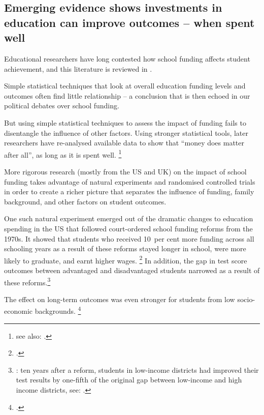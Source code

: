 \documentclass{grattan}
\begin{document}
\subsection{Emerging evidence shows investments in education can improve outcomes -- when spent well}\label{subsec:emerging-evidence-shows-investments-in-education-can-improve-outcomes}

Educational researchers have long contested how school funding affects student achievement, and this literature is reviewed in .

Simple statistical techniques that look at overall education funding levels and outcomes often find little relationship -- a conclusion that is then echoed in our political debates over school funding.

But using simple statistical techniques to assess the impact of funding fails to disentangle the influence of other factors.
Using stronger statistical tools, later researchers have re-analysed available data to show that ``money does matter after all'', as long as it is spent well.%
\footnote{\textcite[][13]{Hedges1994ExchangePartI} see also: \textcites{Greenwald1996EffectSchoolResources}{Krueger2003EconomicConsiderationsClass}.}

More rigorous research (mostly from the US and UK) on the impact of school funding takes advantage of natural experiments and randomised controlled trials in order to create a richer picture that separates the influence of funding, family background, and other factors on student outcomes.

One such natural experiment emerged out of the dramatic changes to education spending in the US that followed court-ordered school funding reforms from the 1970s.
It showed that students who received 10~per cent more funding across all schooling years as a result of these reforms stayed longer in school, were more likely to graduate, and earnt higher wages.%
\footcite{Jackson2016EffectsSchoolSpending}
In addition, the gap in test score outcomes between advantaged and disadvantaged students narrowed as a result of these reforms.\footnote{\textcite[][80]{Card2002Schoolfinancereform}: ten years after a reform, students in low-income districts had improved their test results by one-fifth of the original gap between low-income and high income districts, see: \textcite{Lafortune2016SchoolFinanceReform}.}

The effect on long-term outcomes was even stronger for students from low socio-economic backgrounds. \footcites{Card2002Schoolfinancereform}{Jackson2016EffectsSchoolSpending}{Lafortune2016SchoolFinanceReform}
\end{document}
